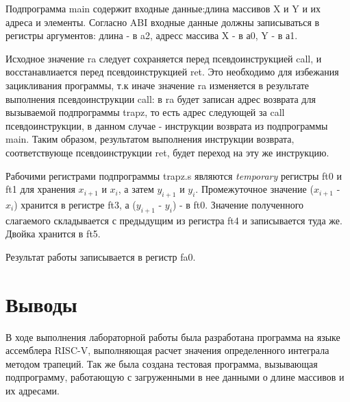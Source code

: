 



Подпрограмма main содержит входные данные:длина массивов X и Y и их адреса и элементы. Согласно ABI входные данные должны записываться в регистры аргументов: длина - в a2, адресс массива X - в а0, Y - в а1.

Исходное значение ra следует сохраняется перед псевдоинструкцией call, и восстанавлиается перед псевдоинструкцией ret. Это необходимо для избежания зацикливания программы, т.к иначе значение ra изменяется в результате выполнения псевдоинструкции call: в ra будет записан адрес возврата для вызываемой подпрограммы trapz, то есть адрес следующей за call псевдоинструкции, в данном случае - инструкции возврата из подпрограммы main. Таким образом, результатом выполнения инструкции возврата, соответствующе псевдоинструкции ret, будет переход на эту же инструкцию.

Рабочими регистрами подпрограммы trapz.s являются \textit{temporary} регистры ft0 и ft1 для хранения $x_{i+1}$ и $x_i$, а затем $y_{i+1}$ и $y_i$. Промежуточное значение ($x_{i+1}$ - $x_i$) хранится в регистре ft3, а ($y_{i+1}$ - $y_i$) - в ft0. Значение полученного слагаемого складывается с предыдущим из регистра ft4 и записывается туда же. Двойка хранится в ft5.

Результат работы записывается в регистр fa0.



\section{Выводы}
В ходе выполнения лабораторной работы была разработана программа на языке ассемблера RISC-V, выполняющая расчет значения определенного интеграла методом трапеций. Так же была создана тестовая программа, вызывающая подпрограмму, работающую с загруженными в нее данными о длине массивов и их адресами.

